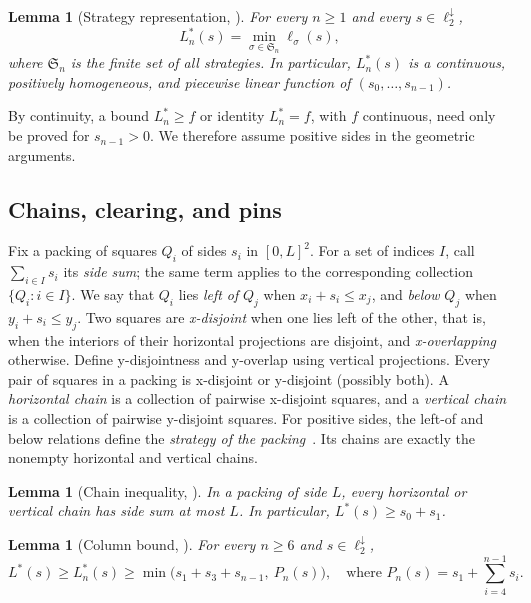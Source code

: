 \documentclass[12pt]{amsart}
\newtheorem{lemma}[theorem]{Lemma}
\theoremstyle{definition}
\theoremstyle{remark}
\numberwithin{equation}{section}
\numberwithin{figure}{section}
\numberwithin{table}{section}
\begin{document}
\begin{lemma}[Strategy representation, {\cite[Proposition~2.5]{BadgerSeven}}]\label{lem:strategy}
For every $n\ge1$ and every $s\in\ell_2^\downarrow$,
\begin{equation}\label{eq:strategy-formula}
L_n^*(s)=\min_{\sigma\in\mathfrak S_n}\ell_\sigma(s),
\end{equation}
where $\mathfrak S_n$ is the finite set of all strategies. In particular,
$L_n^*(s)$ is a continuous, positively homogeneous, and piecewise linear
function of $(s_0,\ldots,s_{n-1})$.
\end{lemma}
By continuity, a bound $L_n^*\ge f$ or identity $L_n^*=f$, with $f$
continuous, need only be proved for $s_{n-1}>0$.
We therefore assume positive sides in the geometric arguments.

\subsection{Chains, clearing, and pins}
Fix a packing of squares $Q_i$ of sides $s_i$ in $[0,L]^2$. For a set of
indices $I$, call $\sum_{i\in I}s_i$ its \emph{side sum}; the same term
applies to the corresponding collection $\{Q_i:i\in I\}$.
We say that $Q_i$ lies \emph{left of} $Q_j$ when $x_i+s_i\le x_j$, and
\emph{below} $Q_j$ when $y_i+s_i\le y_j$. Two squares are \emph{x-disjoint}
when one lies left of the other, that is, when the interiors of their
horizontal projections are disjoint, and \emph{x-overlapping} otherwise.
Define y-disjointness and y-overlap using vertical projections. Every pair
of squares in a packing is x-disjoint or y-disjoint (possibly both).
A \emph{horizontal chain} is a collection of pairwise x-disjoint squares,
and a \emph{vertical chain} is a collection of pairwise y-disjoint squares.
For positive sides, the left-of and below relations define the
\emph{strategy of the packing}~\cite[Section~2.2]{BadgerSeven}.
Its chains are exactly the nonempty horizontal and vertical chains.

\begin{lemma}[Chain inequality, {\cite[Lemma~3.1]{BadgerSeven}}]\label{lem:chain}
In a packing of side $L$, every horizontal or vertical chain has side sum
at most $L$. In particular, $L^*(s)\ge s_0+s_1$.
\end{lemma}

\begin{lemma}[Column bound, {\cite[Proposition~3.7]{BadgerSeven}}]\label{lem:column}
For every $n\ge6$ and $s\in\ell_2^\downarrow$,
\[
L^*(s)\ge L_n^*(s)\ge\min\bigl(s_1+s_3+s_{n-1},\ P_n(s)\bigr),\quad
\text{where }P_n(s)=s_1+\sum_{i=4}^{n-1}s_i.
\]
\end{lemma}
\end{document}
